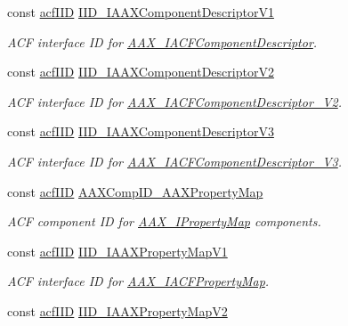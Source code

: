 \begin{Indent}
\begin{DoxyCompactItemize}
const \mbox{\hyperlink{a00269_a59df0b41744eee7a066787aaedf97f67}{acf\+I\+ID}} \mbox{\hyperlink{a00683_a0b4fc5adc909e67eef6a787aa2acdd7e}{I\+I\+D\+\_\+\+I\+A\+A\+X\+Component\+Descriptor\+V1}}
\begin{DoxyCompactList}\small\item\em A\+CF interface ID for \mbox{\hyperlink{a01625}{A\+A\+X\+\_\+\+I\+A\+C\+F\+Component\+Descriptor}}. \end{DoxyCompactList}\item 
const \mbox{\hyperlink{a00269_a59df0b41744eee7a066787aaedf97f67}{acf\+I\+ID}} \mbox{\hyperlink{a00683_a1d39a90fada901d3d0a384324e79dde5}{I\+I\+D\+\_\+\+I\+A\+A\+X\+Component\+Descriptor\+V2}}
\begin{DoxyCompactList}\small\item\em A\+CF interface ID for \mbox{\hyperlink{a01629}{A\+A\+X\+\_\+\+I\+A\+C\+F\+Component\+Descriptor\+\_\+\+V2}}. \end{DoxyCompactList}\item 
const \mbox{\hyperlink{a00269_a59df0b41744eee7a066787aaedf97f67}{acf\+I\+ID}} \mbox{\hyperlink{a00683_a4cc4d308ddb1baa7a91f6ac35151987e}{I\+I\+D\+\_\+\+I\+A\+A\+X\+Component\+Descriptor\+V3}}
\begin{DoxyCompactList}\small\item\em A\+CF interface ID for \mbox{\hyperlink{a01633}{A\+A\+X\+\_\+\+I\+A\+C\+F\+Component\+Descriptor\+\_\+\+V3}}. \end{DoxyCompactList}\item 
const \mbox{\hyperlink{a00269_a59df0b41744eee7a066787aaedf97f67}{acf\+I\+ID}} \mbox{\hyperlink{a00683_a83d2267df335ec2976f28c1739252da0}{A\+A\+X\+Comp\+I\+D\+\_\+\+A\+A\+X\+Property\+Map}}
\begin{DoxyCompactList}\small\item\em A\+CF component ID for \mbox{\hyperlink{a01869}{A\+A\+X\+\_\+\+I\+Property\+Map}} components. \end{DoxyCompactList}\item 
const \mbox{\hyperlink{a00269_a59df0b41744eee7a066787aaedf97f67}{acf\+I\+ID}} \mbox{\hyperlink{a00683_a6f1eedd8a2328492efa7a357565b8e2d}{I\+I\+D\+\_\+\+I\+A\+A\+X\+Property\+Map\+V1}}
\begin{DoxyCompactList}\small\item\em A\+CF interface ID for \mbox{\hyperlink{a01745}{A\+A\+X\+\_\+\+I\+A\+C\+F\+Property\+Map}}. \end{DoxyCompactList}\item 
const \mbox{\hyperlink{a00269_a59df0b41744eee7a066787aaedf97f67}{acf\+I\+ID}} \mbox{\hyperlink{a00683_a39b9cbfe4f60ec41bb43be35e3d4d568}{I\+I\+D\+\_\+\+I\+A\+A\+X\+Property\+Map\+V2}}

\end{DoxyCompactItemize}
\end{Indent}
